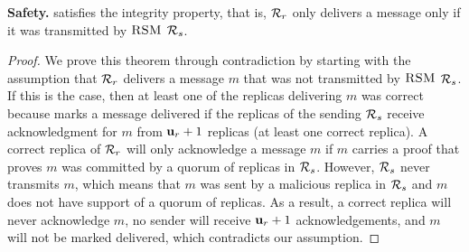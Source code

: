 





\begin{theorem}
    {\bf Safety.} \Scrooge{} satisfies the integrity property, that is, \RSM{} $\mathcal{R}_{r}$ only delivers a message 
    only if it was transmitted by $\textsc{RSM}{}$ $\mathcal{R}_{s}$.
\end{theorem}
\begin{proof}
    We prove this theorem through contradiction by starting with the assumption that \RSM{} $\mathcal{R}_{r}$ delivers a message $m$ that 
    was not transmitted by $\textsc{RSM}{}$ $\mathcal{R}_{s}$.
    If this is the case, then at least one of the replicas delivering $m$ was correct because \Scrooge{} marks a message delivered 
    if the replicas of the sending \RSM{} $\mathcal{R}_{s}$ receive acknowledgment for $m$ from $\textbf{u}_{r}+1$ replicas (at least one correct replica).
    A correct replica of $\mathcal{R}_{r}$ will only acknowledge a message $m$ if $m$ carries a proof that proves $m$ was
    committed by a quorum of replicas in $\mathcal{R}_{s}$.
    However, \RSM{} $\mathcal{R}_{s}$ never transmits $m$, which means that $m$ was sent by a malicious replica in $\mathcal{R}_{s}$ and 
    $m$ does not have support of a quorum of replicas.
    As a result, a correct replica will never acknowledge $m$, no sender will receive $\textbf{u}_{r}+1$ acknowledgements, and 
    $m$ will not be marked delivered, which contradicts our assumption.
\end{proof}


